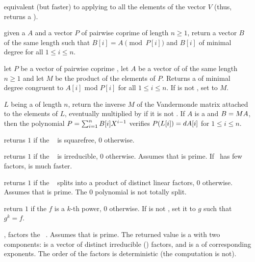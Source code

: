  equivalent (but
faster) to applying  to all the elements of the
vector $V$ (thus, returns a ).

given a  $A$ and a vector $P$ of pairwise coprime  of length
$n\ge 1$, return a vector $B$ of the same length such that $B[i] =
A\pmod{P[i]}$ and $B[i]$ of minimal degree for all $1\leq i\leq n$.

let $P$ be a vector of pairwise coprime , let $A$ be a vector of
 of the same length $n\ge 1$ and let $M$ be the product of the
elements of $P$. Returns a  of minimal degree congruent to $A[i]$ mod
$P[i]$ for all $1\leq i\leq n$.
If  is not , set  to $M$.

 $L$ being a 
of length $n$, return the inverse $M$ of the Vandermonde matrix attached to
the elements of $L$, eventually multiplied by  if it is not
. If $A$ is a  and $B=M\*A$, then the polynomial
$P=\sum_{i=1}^n B[i]\*X^{i-1}$ verifies $P(L[i])=d\*A[i]$ for
$1 \leq i \leq n$.

 returns $1$ if the
~ is squarefree, $0$ otherwise.

 returns $1$ if the ~
is irreducible, $0$ otherwise. Assumes that  is prime. If~ has
few factors,  is much faster.

 returns $1$ if the
~ splits into a product of distinct linear factors, $0$
otherwise. Assumes that  is prime. The $0$ polynomial is not
totally split.

return $1$ if the  $f$ is a $k$-th power, $0$ otherwise.
If  is not , set it to $g$ such that $g^k = f$.

, factors the ~. Assumes
that  is prime. The returned value  is a  with two
components:  is a vector of distinct irreducible ()
factors, and  is a  of corresponding exponents. The
order of the factors is deterministic (the computation is not).

